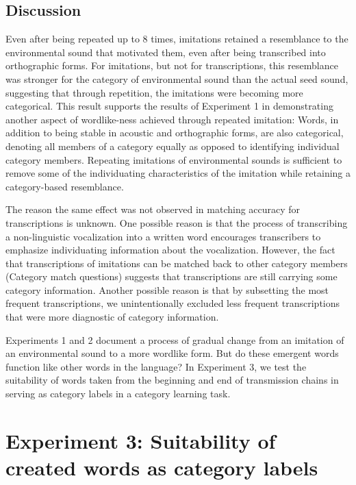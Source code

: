 \documentclass[english,floatsintext,man]{apa6}
\theoremstyle{definition}
\theoremstyle{definition}
\theoremstyle{remark}
\begin{document}
\subsection{Discussion}\label{discussion-1}

Even after being repeated up to 8 times, imitations retained a
resemblance to the environmental sound that motivated them, even after
being transcribed into orthographic forms. For imitations, but not for
transcriptions, this resemblance was stronger for the category of
environmental sound than the actual seed sound, suggesting that through
repetition, the imitations were becoming more categorical. This result
supports the results of Experiment 1 in demonstrating another aspect of
wordlike-ness achieved through repeated imitation: Words, in addition to
being stable in acoustic and orthographic forms, are also categorical,
denoting all members of a category equally as opposed to identifying
individual category members. Repeating imitations of environmental
sounds is sufficient to remove some of the individuating characteristics
of the imitation while retaining a category-based resemblance.

The reason the same effect was not observed in matching accuracy for
transcriptions is unknown. One possible reason is that the process of
transcribing a non-linguistic vocalization into a written word
encourages transcribers to emphasize individuating information about the
vocalization. However, the fact that transcriptions of imitations can be
matched back to other category members (Category match questions)
suggests that transcriptions are still carrying some category
information. Another possible reason is that by subsetting the most
frequent transcriptions, we unintentionally excluded less frequent
transcriptions that were more diagnostic of category information.

Experiments 1 and 2 document a process of gradual change from an
imitation of an environmental sound to a more wordlike form. But do
these emergent words function like other words in the language? In
Experiment 3, we test the suitability of words taken from the beginning
and end of transmission chains in serving as category labels in a
category learning task.

\section{Experiment 3: Suitability of created words as category
labels}\label{experiment-3-suitability-of-created-words-as-category-labels}
\end{document}
